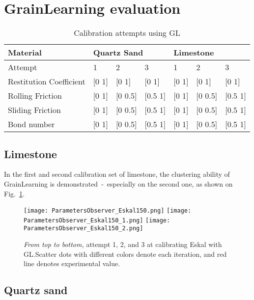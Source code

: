 \section{GrainLearning evaluation}\label{section:GLPerformance} 

\begin{table}[H]
    \centering
    \begin{tabular}{l|lll|lll}
    Material                & \multicolumn{3}{l|}{Quartz Sand}       & \multicolumn{3}{l}{Limestone}          \\ \hline
    Attempt                 & 1          & 2           & 3           & 1          & 2           & 3           \\ \hline
    Restitution Coefficient & {[}0  1{]} & {[}0  1{]}  & {[}0 1{]}   & {[}0  1{]} & {[}0  1{]}  & {[}0 1{]}   \\
    Rolling Friction        & {[}0 1{]}  & {[}0 0.5{]} & {[}0.5 1{]} & {[}0 1{]}  & {[}0 0.5{]} & {[}0.5 1{]} \\
    Sliding Friction        & {[}0 1{]}  & {[}0 0.5{]} & {[}0.5 1{]} & {[}0 1{]}  & {[}0 0.5{]} & {[}0.5 1{]} \\
    Bond number             & {[}0 1{]}  & {[}0 0.5{]} & {[}0.5 1{]} & {[}0 1{]}  & {[}0 0.5{]} & {[}0.5 1{]} \\
    \end{tabular}
    \caption{Calibration attempts using GL}\label{table:GLCalibration}
\end{table}
                                        
\subsection{Limestone}
In the first and second calibration set of limestone, the clustering ability of GrainLearning is demonstrated~-~especially on the second one, as shown on Fig.~\ref{fig:Eskal}. 
\begin{figure}[H]
    \centering
    \texttt{[image: ParametersObserver\_Eskal150.png]}
    \texttt{[image: ParametersObserver\_Eskal150\_1.png]}
    \texttt{[image: ParametersObserver\_Eskal150\_2.png]}
    \caption{\textit{From top to bottom,} attempt 1, 2, and 3 at calibrating Eskal with GL.\@ Scatter dots with different colors denote each iteration, and red line denotes experimental value.}\label{fig:Eskal}
\end{figure}


\subsection{Quartz sand}

